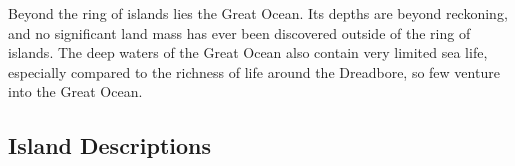         Beyond the ring of islands lies the Great Ocean.
        Its depths are beyond reckoning, and no significant land mass has ever been discovered outside of the ring of islands.
        The deep waters of the Great Ocean also contain very limited sea life, especially compared to the richness of life around the Dreadbore, so few venture into the Great Ocean.

    \subsection{Island Descriptions}
